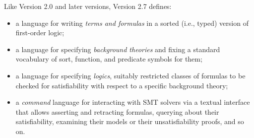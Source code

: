 Like Version 2.0 and later versions, Version 2.7 defines:
\begin{itemize}
\item
a language for writing \emph{terms and formulas} in a sorted (i.e., typed) 
version of first-order logic;
\item
a language for specifying \emph{background theories} and 
fixing a standard vocabulary of sort, function, and predicate symbols for them;
\item
a language for specifying \emph{logics}, 
suitably restricted classes of formulas to be checked 
for satisfiability with respect to a specific background theory;
\item
a \emph{command} language for interacting with SMT solvers
via a textual interface
that allows asserting and retracting formulas, 
querying about their satisfiability, examining their models or 
their unsatisfiability proofs, and so on.

\end{itemize}

